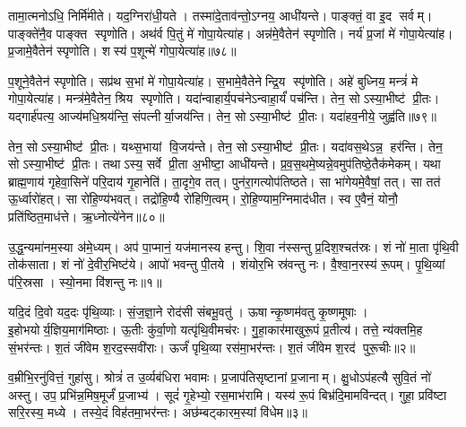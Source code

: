 तामा॒त्मनोऽधि॒ निर्मि॑मीते। यद॒ग्निरा॑धी॒यते। तस्मा॑दे॒ताव॑न्तो॒ऽग्नय॒ आधी॑यन्ते। पाङ्क्तं॒ वा इ॒द सर्वम्। पाङ्क्ते॑नै॒व पाङ्क्त स्पृणोति। अथ॑र्व पि॒तुं मे॑ गोपा॒येत्या॑ह। अन्न॑मे॒वैतेन॑ स्पृणोति। नर्य॑ प्र॒जां मे॑ गोपा॒येत्या॑ह। प्र॒जामे॒वैतेन॑ स्पृणोति। शस्य॑ प॒शून्मे॑ गोपा॒येत्या॑ह॥७८॥

प॒शूने॒वैतेन॑ स्पृणोति। सप्र॑थ स॒भां मे॑ गोपा॒येत्या॑ह। स॒भामे॒वैतेनेन्द्रि॒य स्पृ॑णोति। अहे॑ बुध्निय॒ मन्त्रं॑ मे गोपा॒येत्या॑ह। मन्त्र॑मे॒वैतेन॒ श्रिय स्पृणोति। यदा॑न्वाहार्य॒पच॑नेऽन्वाहा॒र्यं॑ पच॑न्ति। तेन॒ सोऽस्या॒भीष्ट॑ प्री॒तः। यद्गार्\mbox{}ह॑पत्य॒ आज्य॑मधि॒श्रय॑न्ति॒ संपत्नीर्या॒जय॑न्ति। तेन॒ सोऽस्या॒भीष्ट॑ प्री॒तः। यदा॑हव॒नीये॒ जुह्व॑ति॥७९॥

तेन॒ सोऽस्या॒भीष्ट॑ प्री॒तः। यथ्स॒भायां वि॒जय॑न्ते। तेन॒ सोऽस्या॒भीष्ट॑ प्री॒तः। यदा॑वस॒थेऽन्न॒ हर॑न्ति। तेन॒ सोऽस्या॒भीष्ट॑ प्री॒तः। तथाऽस्य॒ सर्वे प्री॒ता अ॒भीष्टा॒ आधी॑यन्ते। प्र॒व॒स॒थमे॒ष्यन्ने॒वमुप॑तिष्ठे॒तैक॑मेकम्। यथा ब्राह्म॒णाय॑ गृहेवा॒सिने॑ परि॒दाय॑ गृ॒हानेति॑। ता॒दृगे॒व तत्। पुन॑रा॒गत्योप॑तिष्ठते। सा भा॑गेयमे॒वैषां॒ तत्। सा तत॑ ऊ॒र्ध्वारो॑हत्। सा रो॑हि॒ण्य॑भवत्। तद्रो॑हि॒ण्यै रो॑हिणि॒त्वम्। रो॒हि॒ण्याम॒ग्निमाद॑धीत। स्व ए॒वैनं॒ योनौ॒ प्रति॑ष्ठित॒माध॑त्ते। ऋ॒ध्नोत्ये॑नेन॥८०॥\anuvakamend[ए॒षा प॒शून्मे॑ गोपा॒येति॒ प्रवि॑ष्टा प॒शून्मे॑ गोपा॒येत्या॑ह॒ जुह्व॑ति तिष्ठते स॒प्त च॑॥१०॥]




\clearpage
{}
\setcounter{anuvakam}{0}
उ॒द्ध॒न्यमा॑नम॒स्या अ॑मे॒ध्यम्। अप॑ पा॒प्मानं॒ यज॑मानस्य हन्तु। शि॒वा न॑स्सन्तु प्र॒दिश॒श्चत॑स्रः। शं नो॑ मा॒ता पृ॑थि॒वी तोक॑साता। शं नो॑ दे॒वीर॒भिष्ट॑ये। आपो॑ भवन्तु पी॒तये। शंयोर॒भि स्र॑वन्तु नः। वै॒श्वा॒न॒रस्य॑ रू॒पम्। पृ॒थि॒व्यां प॑रि॒स्रसा। स्यो॒नमा वि॑शन्तु नः॥१॥

यदि॒दं दि॒वो यद॒दः पृ॑थि॒व्याः। सं॒ज॒ज्ञा॒ने रोद॑सी संबभू॒वतु॑। ऊषान्कृ॒ष्णम॑वतु कृ॒ष्णमूषाः। इ॒होभयोर्य॒ज्ञिय॒माग॑मिष्ठाः। ऊ॒तीः कु॑र्वा॒णो यत्पृ॑थि॒वीमच॑रः। गु॒हा॒कार॑माखुरू॒पं प्र॒तीत्य॑। तत्ते॒ न्य॑क्तमि॒ह सं॒भर॑न्तः। श॒तं जी॑वेम श॒रद॒स्सवी॑राः। ऊर्जं॑ पृथि॒व्या रस॑मा॒भर॑न्तः। श॒तं जी॑वेम श॒रद॑ पुरू॒चीः॥२॥

व॒म्रीभि॒रनु॑वित्तं॒ गुहा॑सु। श्रोत्रं॑ त उ॒र्व्यब॑धिरा भवामः। प्र॒जाप॑तिसृष्टानां प्र॒जानाम्। क्षु॒धोऽप॑हत्यै सुवि॒तं नो॑ अस्तु। उप॒ प्रभि॑न्न॒मिष॒मूर्जं॑ प्र॒जाभ्य॑। सूदं॑ गृ॒हेभ्यो॒ रस॒माभ॑रामि। यस्य॑ रू॒पं बिभ्र॑दि॒मामवि॑न्दत्। गुहा॒ प्रवि॑ष्टा सरि॒रस्य॒ मध्ये। तस्ये॒दं विह॑तमा॒भर॑न्तः। अछ॑म्बट्कारम॒स्यां वि॑धेम॥३॥

